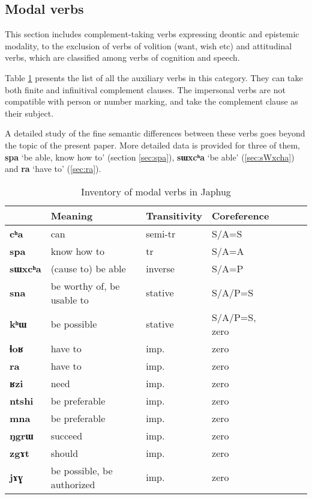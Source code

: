 \documentclass[oneside,a4paper,11pt]{article}
\newcommand{\ipa}[1]{\textbf{\phon#1}} %
\newcommand{\jpg}[2]{\ipa{#1} `#2'} %
\begin{document}
  \subsection{Modal verbs}
This section includes complement-taking verbs expressing deontic and epistemic modality, to the exclusion of verbs of volition (want, wish etc) and attitudinal verbs, which are classified among verbs of cognition and speech.

Table \ref{tab:modal.verbs} presents the list of all the auxiliary verbs in this category. They can take both finite and infinitival complement clauses. The impersonal verbs are not compatible with person or number marking, and take the complement clause as their subject. 

A detailed study of the fine semantic differences between these verbs goes beyond the topic of the present paper. More detailed data is provided for three of them, \jpg{spa}{be able, know how to} (section \ref{sec:spa}), \jpg{sɯxcʰa}{be able} (\ref{sec:sWxcha}) and \jpg{ra}{have to} (\ref{sec:ra}).

\begin{table}[H]
\caption{Inventory of modal verbs in Japhug} \centering \label{tab:modal.verbs}
\begin{tabular}{lllllll}
\toprule
 & 	Meaning & 	Transitivity & 	Coreference & 	\\
 \midrule
\ipa{cʰa} & 	can & 	semi-tr & 	S/A=S & 	\\
\ipa{spa} & 	know how to & 	tr & 	S/A=A & 	\\
\ipa{sɯxcʰa} & 	(cause to) be able & 	inverse & 	S/A=P & 	\\
\ipa{sna} & 	be worthy of, be usable to & 	stative & 	S/A/P=S & 	\\
\ipa{kʰɯ} & 	be possible & 	stative & 	S/A/P=S, zero & 	\\
\midrule
\ipa{ɬoʁ} & 	have to & 	imp. & 	zero & 	\\
\ipa{ra} & 	have to & 	imp. & 	zero & 	\\
\ipa{ʁzi} & 	need & 	imp. & 	zero & 	\\
\ipa{ntshi} & 	be preferable & 	imp. & 	zero & 	\\
\ipa{mna} & 	be preferable & 	imp. & 	zero & 	\\
\ipa{ŋgrɯ} & 	succeed & 	imp. & 	zero & 	\\
\ipa{zgɤt} & 	should & 	imp. & 	zero & 	\\
\ipa{jɤɣ} & 	be possible, be authorized & 	imp. & 	zero & 	\\
\bottomrule
\end{tabular}
\end{table}
\end{document}
